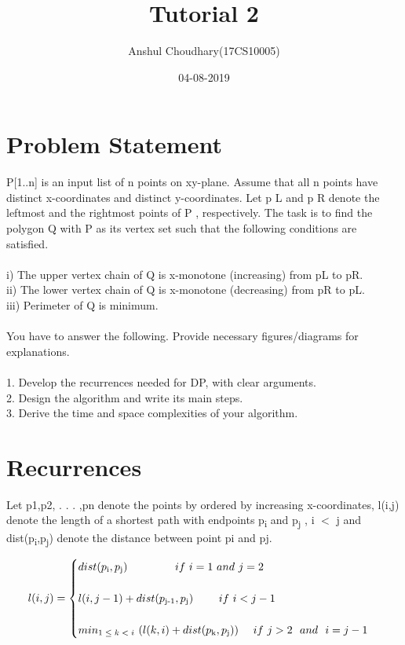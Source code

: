 \documentclass{article}
\title{Tutorial 2}
\date{04-08-2019}
\author{Anshul Choudhary(17CS10005)}
\begin{document}
  \maketitle
  
  \section{Problem Statement}
    
P[1..n] is an input list of n points on xy-plane. Assume that all n points have distinct x-coordinates and
distinct y-coordinates. Let p L and p R denote the leftmost and the rightmost points of P , respectively.
The task is to find the polygon Q with P as its vertex set such that the following conditions are
satisfied.\\\\
i) The upper vertex chain of Q is x-monotone (increasing) from pL to pR.\\
ii) The lower vertex chain of Q is x-monotone (decreasing) from pR to pL.\\
iii) Perimeter of Q is minimum.\\\\
You have to answer the following. Provide necessary figures/diagrams for explanations.\\\\
1. Develop the recurrences needed for DP, with clear arguments.\\
2. Design the algorithm and write its main steps.\\
3. Derive the time and space complexities of your algorithm.\\
  
  \section{Recurrences}
  
  	Let p1,p2, . . . ,pn denote the points by ordered by increasing x-coordinates, l(i,j) denote the length of a shortest path with endpoints p\textsubscript{i} and p\textsubscript{j} , i $<$ j and dist(p\textsubscript{i},p\textsubscript{j}) denote the distance between point pi and pj.

    
      \begin{equation*}
        l(i,j)=\begin{cases}
		   dist(p\textsubscript{i},p\textsubscript{j})\ \ \ \ \ \ \ \ \ \ \  \ \ if\ i = 1\ and\ j = 2 \\
			\\
           l(i,j-1)+dist(p\textsubscript{j-1},p\textsubscript{j}) \ \ \ \ \ \ \ if\ i < j-1\\
			\\
           min\textsubscript{$1 \leq k < i$}\ (l(k,i) + dist(p\textsubscript{k},p\textsubscript{j}))\ \ \ \ if\ j > 2\ \ and \ \ i=j-1\\
               	\end{cases}
        \end{equation*}
  
\end{document}
